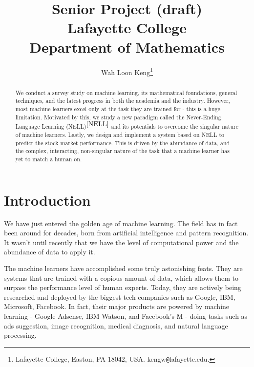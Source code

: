 \documentclass[12pt]{article}  %
\begin{document}
\title{Senior Project (draft)\\
Lafayette College \\
Department of Mathematics
}

\author{
{Wah Loon Keng}\thanks{
Lafayette College,
Easton, PA 18042, USA.
kengw{\tt @}lafayette.edu.}
}
\maketitle


\begin{abstract}
We conduct a survey study on machine learning, its mathematical foundations, general techniques, and the latest progress in both the academia and the industry. However, most machine learners  excel only at the task they are trained for - this is a huge limitation. Motivated by this, we study a new paradigm called the Never-Ending Language Learning (NELL)$^{\ref{NELL}}$ and its potentials to overcome the singular nature of machine learners. Lastly, we design and implement a system based on NELL to predict the stock market performance. This is driven by the abundance of data, and the complex, interacting, non-singular nature of the task that a machine learner has yet to match a human on.
\end{abstract}


\clearpage
\tableofcontents
\clearpage






\section{Introduction} \label{intro}

We have just entered the golden age of machine learning. The field has in fact been around for decades, born from artificial intelligence and pattern recognition. It wasn't until recently that we have the level of computational power and the abundance of data to apply it. 

The machine learners have accomplished some truly astonishing feats. They are systems that are trained with a copious amount of data, which allows them to surpass the performance level of human experts. Today, they are actively being researched and deployed by the biggest tech companies such as Google, IBM, Microsoft, Facebook. In fact, their major products are powered by machine learning - Google Adsense, IBM Watson, and Facebook's M - doing tasks such as ads suggestion, image recognition, medical diagnosis, and natural language processing.
\end{document}
